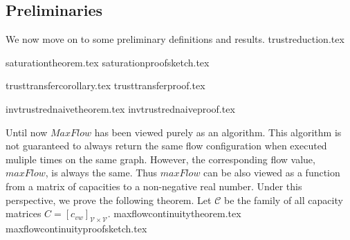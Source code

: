 \subsection{Preliminaries}
  We now move on to some preliminary definitions and results.
  {trustreduction.tex}

  {saturationtheorem.tex}
  {saturationproofsketch.tex}

  {trusttransfercorollary.tex}
  {trusttransferproof.tex}

  {invtrustrednaivetheorem.tex}
  {invtrustrednaiveproof.tex}

  Until now $MaxFlow$ has been viewed purely as an algorithm. This algorithm is not guaranteed to always return the same
  flow configuration when executed muliple times on the same graph. However, the corresponding flow value, $maxFlow$, is
  always the same. Thus $maxFlow$ can be also viewed as a function from a matrix of capacities to a non-negative real number.
  Under this perspective, we prove the following theorem. Let $\mathcal{C}$ be the family of all capacity matrices
  $C = [c_{vw}]_{\mathcal{V} \times \mathcal{V}}$.
  {maxflowcontinuitytheorem.tex}
  {maxflowcontinuityproofsketch.tex}

